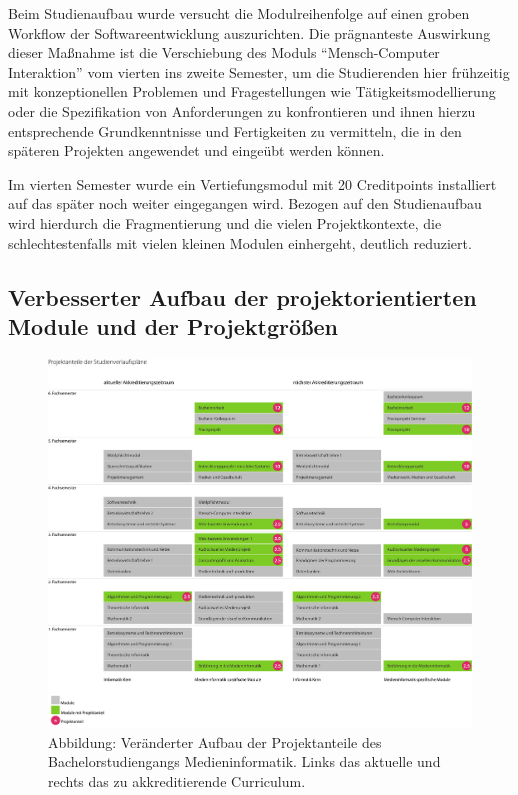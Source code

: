 Beim Studienaufbau wurde versucht die Modulreihenfolge auf einen groben
Workflow der Softwareentwicklung auszurichten. Die prägnanteste
Auswirkung dieser Maßnahme ist die Verschiebung des Moduls
``Mensch-Computer Interaktion'' vom vierten ins zweite Semester, um die
Studierenden hier frühzeitig mit konzeptionellen Problemen und
Fragestellungen wie Tätigkeitsmodellierung oder die Spezifikation von
Anforderungen zu konfrontieren und ihnen hierzu entsprechende
Grundkenntnisse und Fertigkeiten zu vermitteln, die in den späteren
Projekten angewendet und eingeübt werden können.

Im vierten Semester wurde ein Vertiefungsmodul mit 20 Creditpoints
installiert auf das später noch weiter eingegangen wird. Bezogen auf den
Studienaufbau wird hierdurch die Fragmentierung und die vielen
Projektkontexte, die schlechtestenfalls mit vielen kleinen Modulen
einhergeht, deutlich reduziert.

\subsection{Verbesserter Aufbau der projektorientierten Module und
der
Projektgrößen}\label{verbesserter-aufbau-der-projektorientierten-module-und-der-projektgruxf6uxdfen}

\begin{figure}[htbp][htbp]
\centering
\includegraphics[width=\columnwidth]{../anhaenge/bilder/ba-projektanteile.pdf}
\caption{Abbildung: Veränderter Aufbau der Projektanteile des
Bachelorstudiengangs Medieninformatik. Links das aktuelle und rechts das
zu akkreditierende Curriculum.}
\end{figure}

